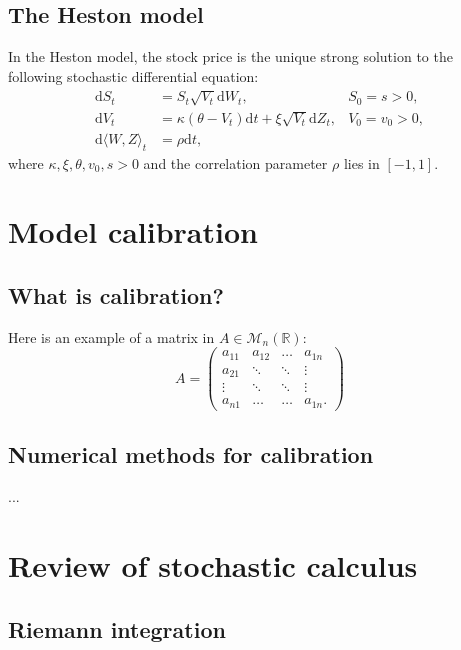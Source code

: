 \documentclass[a4paper]{article}
\theoremstyle{definition}
\newcommand{\D}{\mathrm{d}}
\newcommand{\RR}{\mathbb{R}}
\numberwithin{equation}{section}
\begin{document}
\subsection{The Heston model}
In the Heston model, the stock price is the unique strong solution to the following stochastic differential equation:
\begin{equation}\label{eq:Heston}
\begin{array}{rll}
\D S_t & = S_t \sqrt{V_t} \D W_t, & S_0 = s>0,\\
\D V_t & = \kappa(\theta-V_t)\D t + \xi\sqrt{V_t}\D Z_t, & V_0 = v_0>0,\\
\D \langle W, Z\rangle_t & = \rho \D t,
\end{array}
\end{equation}
where $\kappa, \xi, \theta, v_0, s>0$ and the correlation parameter $\rho$ lies in $[-1,1]$.

\newpage
\section{Model calibration}
\subsection{What is calibration?}
Here is an example of a matrix in $A\in\mathcal{M}_n(\RR)$:
$$
A = 
\begin{pmatrix}
a_{11} & a_{12} & \ldots & a_{1n}\\
a_{21} & \ddots & \ddots  & \vdots\\
\vdots &  \ddots & \ddots  & \vdots\\
a_{n1} &  \ldots &  \ldots & a_{1n}.
\end{pmatrix}
$$

\subsection{Numerical methods for calibration}
...




\appendix

\section{Review of stochastic calculus}
\subsection{Riemann integration}
\end{document}
